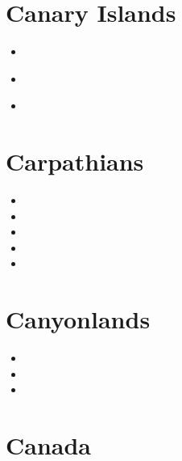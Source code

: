 \section{Canary Islands}

\begin{small}
\begin{itemize}
\item[\twothousandfifteen]
\\
\item[\twothousandtwentytwo]
 \\
\item[\twothousandtwentythree]
\end{itemize}
\end{small}


\section{Carpathians}

\begin{small}
\begin{itemize}
\item[\twothousand]
\item[\twothousandfour]
\item[\twothousandfive]
\item[\twothousandsix]
\item[\twothousandnineteen]
\end{itemize}
\end{small}

\section{Canyonlands}

\begin{small}
\begin{itemize}
\item[\nineteenninetyfour]
\item[\twothousandtwo]
\item[\twothousandthree]
\end{itemize}
\end{small}

\section{Canada}

